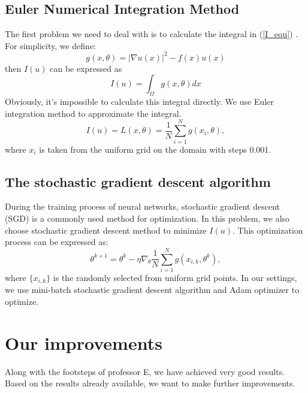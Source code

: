 \documentclass{article}
\begin{document}
\subsection{Euler Numerical Integration Method}   
\par The first problem we need to deal with is to calculate the integral in (\ref{I_equ})
 . For simplicity, we define:
 \begin{equation}
 g(x,\theta)=|\nabla u(x)|^2-f(x)u(x)
 \end{equation}
 then $I(u)$ can be expressed as
 \begin{equation}
 I(u)=\int _{\Omega}g(x,\theta)dx
 \end{equation}
 Obviously, it's impossible to calculate this integral directly. We use Euler integration method to approximate the integral.
 \begin{equation}
 I(u)=L(x,\theta)=\frac{1}{N}\sum\limits_{i=1}^{N}g(x_i,\theta),
 \end{equation}
 where $x_i$ is taken from the uniform grid on the domain with steps 0.001.
 \subsection{The stochastic gradient descent algorithm}
 During the training process of neural networks, stochastic gradient descent (SGD) is a commonly used method for optimization. In this problem, we also choose stochastic gradient descent method to minimize $I(u)$. This optimization process can be expressed as:
 \begin{equation}
 \theta^{k+1}=\theta^{k}-\eta \nabla_{\theta}\frac{1}{N}\sum\limits_{i=1}^{N}g(x_{i,k},\theta^k),
 \end{equation}
 where $\{x_{i,k}\}$ is the randomly selected from uniform grid points. In our settings, we use mini-batch stochastic gradient descent algorithm and Adam \cite{kingma2014adam} optimizer to optimize.

\section{Our improvements}
\par Along with the footsteps of professor E, we have achieved very good results. Based on the results already available, we want to make further improvements. 
\end{document}
